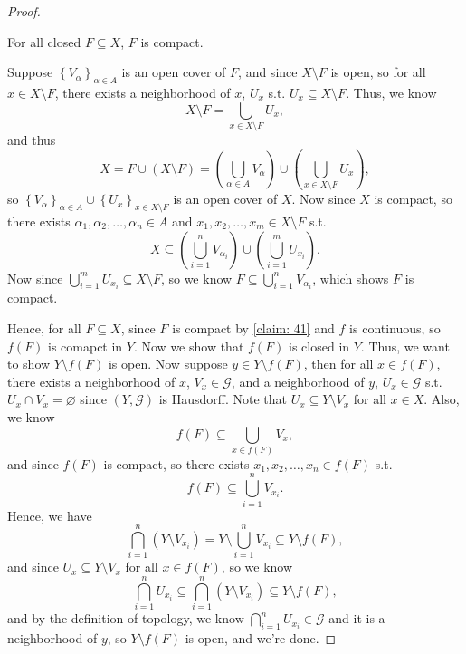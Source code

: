 \begin{proof}
  \begin{claim} \label{claim: 41}
    For all closed \(F \subseteq X\), \(F\) is compact.  
  \end{claim}
  \begin{explanation}
    Suppose \(\left\{ V_\alpha  \right\}_{\alpha \in A} \) is an open cover of \(F\), and since \(X \setminus F\) is open, so for all \(x \in X \setminus F\), there exists a neighborhood of \(x\), \(U_x\) s.t. \(U_x \subseteq X \setminus F\). Thus, we know 
    \[
      X \setminus F = \bigcup_{x \in X \setminus F} U_x,
    \] and thus 
    \[
      X = F \cup (X \setminus F) = \left( \bigcup_{\alpha \in A} V_\alpha   \right) \cup \left( \bigcup_{x \in X \setminus F} U_x  \right), 
    \] so \(\left\{ V_\alpha  \right\}_{\alpha \in A} \cup \left\{ U_x \right\}_{x \in X \setminus F}  \) is an open cover of \(X\). Now since \(X\) is compact, so there exists \(\alpha _1, \alpha _2, \dots , \alpha _n \in A\) and \(x_1, x_2, \dots , x_m \in X \setminus F\) s.t. 
    \[
      X \subseteq \left( \bigcup_{i=1}^{n} V_{\alpha _i}  \right) \cup \left( \bigcup_{i=1}^{m} U_{x_i} \right).  
    \]  
    Now since \(\bigcup_{i=1}^{m} U_{x_i} \subseteq X \setminus F \), so we know \(F \subseteq \bigcup_{i=1}^{n} V_{\alpha _i} \), which shows \(F\) is compact.   
  \end{explanation}
  Hence, for all \(F \subseteq X\), since \(F\) is compact by \autoref{claim: 41} and \(f\) is continuous, so \(f(F)\) is comapct in \(Y\). Now we show that \(f(F)\) is closed in \(Y\). Thus, we want to show \(Y \setminus f(F)\) is open. Now suppose \(y \in Y \setminus f(F)\), then for all \(x \in f(F)\), there exists a neighborhood of \(x\), \(V_x \in \mathcal{G} \), and a neighborhood of \(y\), \(U_x \in \mathcal{G} \) s.t. \(U_x \cap V_x = \varnothing \) since \((Y, \mathcal{G} )\) is Hausdorff. Note that \(U_x \subseteq Y \setminus V_x\) for all \(x \in X\). Also, we know 
  \[
    f(F) \subseteq  \bigcup_{x \in f(F)} V_x, 
  \] and since \(f(F)\) is compact, so there exists \(x_1, x_2, \dots , x_n \in f(F)\) s.t. 
  \[
    f(F) \subseteq \bigcup_{i=1}^{n} V_{x_i}. 
  \] Hence, we have 
  \[
    \bigcap_{i=1}^{n} (Y \setminus V_{x_i}) = Y \setminus \bigcup_{i=1}^{n} V_{x_i} \subseteq Y \setminus f(F),  
  \] and since \(U_x \subseteq Y \setminus V_x\) for all \(x \in f(F)\), so we know 
  \[
    \bigcap_{i=1}^{n} U_{x_i} \subseteq \bigcap_{i=1}^{n} \left( Y \setminus V_{x_i} \right) \subseteq Y \setminus f(F), 
  \] and by the definition of topology, we know \(\bigcap _{i = 1}^n U_{x_i} \in \mathcal{G} \) and it is a neighborhood of \(y\), so \(Y \setminus f(F)\) is open, and we're done.   

\end{proof}
